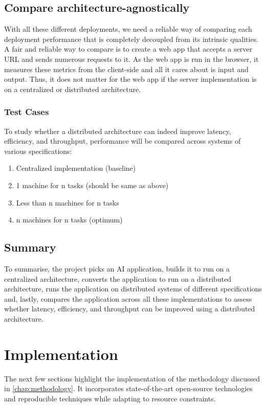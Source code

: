 \documentclass{report}
\begin{document}
\section{Compare architecture-agnostically}
With all these different deployments, we need a reliable way of comparing each deployment performance that is completely decoupled from its intrinsic qualities.
A fair and reliable way to compare is to create a web app that accepts a server URL and sends numerous requests to it.
As the web app is run in the browser, it measures these metrics from the client-side and all it cares about is input and output.
Thus, it does not matter for the web app if the server implementation is on a centralized or distributed architecture.

\subsection{Test Cases}
To study whether a distributed architecture can indeed improve latency, efficiency, and throughput, performance will be compared across systems of various specifications:

\begin{enumerate}
  \item Centralized implementation (baseline)
  \item 1 machine for n tasks (should be same as above)
  \item Less than n machines for n tasks
  \item n machines for n tasks (optimum)
\end{enumerate}

\section{Summary}
To summarise, the project picks an AI application, builds it to run on a centralized architecture, converts the application to run on a distributed architecture, runs the application on distributed systems of different specifications and, lastly, compares the application across all these implementations to assess whether latency, efficiency, and throughput can be improved using a distributed architecture.

\chapter{Implementation}\label{chap:implementation}

The next few sections highlight the implementation of the methodology discussed in \cref{chap:methodology}.
It incorporates state-of-the-art open-source technologies and reproducible techniques while adapting to resource constraints.
\end{document}
